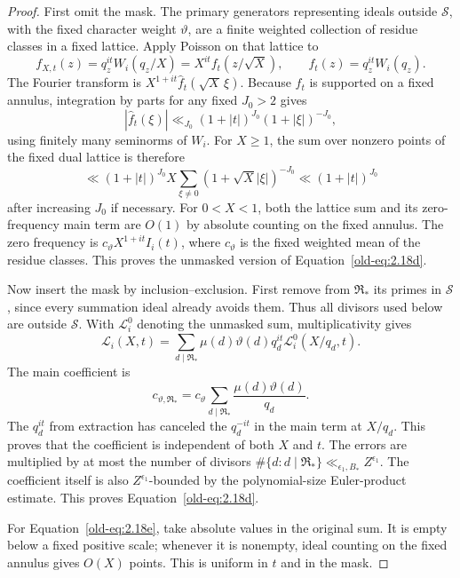 \documentclass[11pt,a4paper]{article}
\numberwithin{equation}{section}
\numberwithin{figure}{section}
\theoremstyle{definition}
\theoremstyle{remark}
\begin{document}
\begin{proof}
First omit the mask.  The primary generators representing ideals
outside \(\mathcal S\), with the fixed character weight
\(\vartheta\), are a finite weighted collection of residue
classes in a fixed lattice.  Apply Poisson on that lattice to
\[
 f_{X,t}(z)=q_z^{it}W_i(q_z/X)
           =X^{it}f_t(z/\sqrt X),\qquad
 f_t(z)=q_z^{it}W_i(q_z).
\]
The Fourier transform is
\(X^{1+it}\widehat f_t(\sqrt X\,\xi)\).
Because \(f_t\) is supported on a fixed annulus, integration by
parts for any fixed \(J_0>2\) gives
\[
 |\widehat f_t(\xi)|
 \ll_{J_0} (1+|t|)^{J_0}(1+|\xi|)^{-J_0},
\]
using finitely many seminorms of \(W_i\).  For \(X\ge1\), the
sum over nonzero points of the fixed dual lattice is therefore
\[
 \ll (1+|t|)^{J_0} X
       \sum_{\xi\ne0}(1+\sqrt X|\xi|)^{-J_0}
 \ll (1+|t|)^{J_0}
\]
after increasing \(J_0\) if necessary.  For \(0<X<1\), both the
lattice sum and its zero-frequency main term are \(O(1)\) by
absolute counting on the fixed annulus.  The zero frequency is
\(c_\vartheta X^{1+it}I_i(t)\), where \(c_\vartheta\) is the
fixed weighted mean of the residue classes.  This proves the
unmasked version of Equation~\eqref{old-eq:2.18d}.

Now insert the mask by inclusion--exclusion.  First remove from
\(\mathfrak R_*\) its primes in \(\mathcal S\), since every
summation ideal already avoids them.  Thus all divisors used below
are outside \(\mathcal S\).  With \(\mathcal L_i^0\) denoting
the unmasked sum, multiplicativity gives
\[
 \mathcal L_i(X,t)
 =\sum_{d\mid\mathfrak R_*}
       \mu(d)\vartheta(d)q_d^{it}\mathcal L_i^0(X/q_d,t).
\]
The main coefficient is
\[
 c_{\vartheta,\mathfrak R_*}
 =c_\vartheta\sum_{d\mid\mathfrak R_*}
             \frac{\mu(d)\vartheta(d)}{q_d}.
\]
The \(q_d^{it}\) from extraction has canceled the
\(q_d^{-it}\) in the main term at \(X/q_d\).  This proves that
the coefficient is independent of both \(X\) and \(t\).
The errors are multiplied by at most the number of divisors
\(\#\{d:d\mid\mathfrak R_*\}\ll_{\epsilon_1,B_*}Z^{\epsilon_1}\).
The coefficient itself is also \(Z^{\epsilon_1}\)-bounded by
the polynomial-size Euler-product estimate.  This proves
Equation~\eqref{old-eq:2.18d}.

For Equation~\eqref{old-eq:2.18e}, take absolute values in the
original sum.  It is empty below a fixed positive scale; whenever
it is nonempty, ideal counting on the fixed annulus gives \(O(X)\)
points.  This is uniform in \(t\) and in the mask.


\end{proof}
\end{document}

